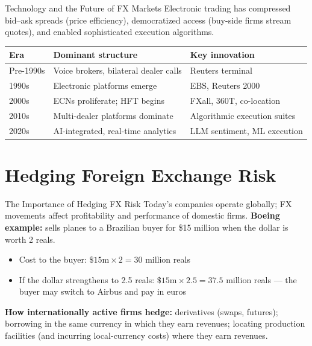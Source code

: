 \documentclass[aspectratio=169]{beamer}
\begin{document}
\begin{frame}{Technology and the Future of FX Markets}
Electronic trading has compressed bid--ask spreads (price efficiency), democratized access (buy-side firms stream quotes), and enabled sophisticated execution algorithms.
\begin{table}
\centering
\small
\begin{tabular}{lll}
\toprule
\textbf{Era} & \textbf{Dominant structure} & \textbf{Key innovation} \\
\midrule
Pre-1990s & Voice brokers, bilateral dealer calls & Reuters terminal \\
1990s & Electronic platforms emerge & EBS, Reuters 2000 \\
2000s & ECNs proliferate; HFT begins & FXall, 360T, co-location \\
2010s & Multi-dealer platforms dominate & Algorithmic execution suites \\
2020s & AI-integrated, real-time analytics & LLM sentiment, ML execution \\
\bottomrule
\end{tabular}
\end{table}
\end{frame}


\section{Hedging Foreign Exchange Risk}

\begin{frame}{The Importance of Hedging FX Risk}
Today's companies operate globally; FX movements affect profitability and performance of domestic firms.
\vspace{0.3em}
\textbf{Boeing example:} sells planes to a Brazilian buyer for \$15 million when the dollar is worth 2 reals.
\begin{itemize}
  \item Cost to the buyer: $\$15\text{m} \times 2 = 30$ million reals
  \item If the dollar strengthens to 2.5 reals: $\$15\text{m} \times 2.5 = 37.5$ million reals --- the buyer may switch to Airbus and pay in euros
\end{itemize}
\vspace{0.3em}
\textbf{How internationally active firms hedge:} derivatives (swaps, futures); borrowing in the same currency in which they earn revenues; locating production facilities (and incurring local-currency costs) where they earn revenues.
\end{frame}
\end{document}
